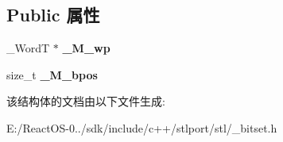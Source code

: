 \subsection*{Public 属性}
\begin{DoxyCompactItemize}
\item 
\mbox{\label{structbitset_1_1reference_a4f3e931b1a39db4bbac3e42183842d34}} 
\+\_\+\+WordT $\ast$ {\bfseries \+\_\+\+M\+\_\+wp}
\item 
\mbox{\label{structbitset_1_1reference_a69e733348370f10ab2d1ffd7e9852c1e}} 
size\+\_\+t {\bfseries \+\_\+\+M\+\_\+bpos}
\end{DoxyCompactItemize}


该结构体的文档由以下文件生成\+:\begin{DoxyCompactItemize}
\item 
E\+:/\+React\+O\+S-\/0../sdk/include/c++/stlport/stl/\+\_\+bitset.\+h\end{DoxyCompactItemize}
